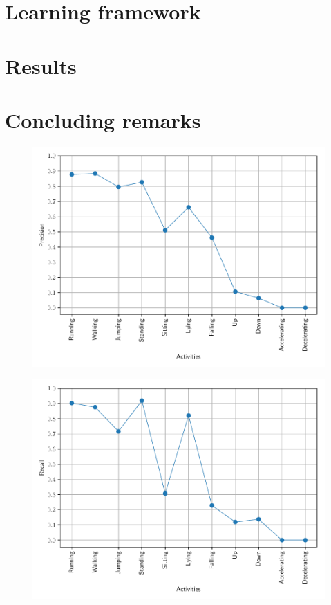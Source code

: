 \documentclass[10pt, conference, letterpaper]{IEEEtran}
\begin{document}
\section{Learning framework}


\section{Results}

\section{Concluding remarks}

\begin{figure}
\includegraphics[scale=0.55]{precision.pdf}
\caption{}
\label{fig:precision}
\end{figure}

\begin{figure}
\includegraphics[scale=0.55]{recall.pdf}
\caption{}
\label{fig:recall}
\end{figure}

















\end{document}
